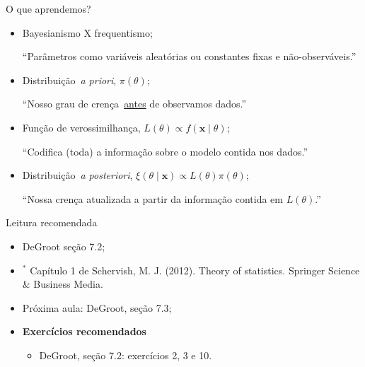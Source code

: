 \begin{frame}{O que aprendemos?}
\begin{itemize}
 \item[\faLightbulbO] Bayesianismo X frequentismo;
 
 ``Parâmetros como variáveis aleatórias ou constantes fixas e não-observáveis.''
 
 \item[\faHourglassStart] Distribuição~\textit{a priori}, $\pi(\theta)$;
 
 ``Nosso grau de crença~\underline{antes} de observamos dados.''
 
 \item[\faInfoCircle] Função de verossimilhança, $L(\theta) \propto f(\boldsymbol x \mid \theta)$;

 ``Codifica (toda) a informação sobre o modelo contida nos dados.''
 
 \item[\faHourglassEnd] Distribuição~\textit{a posteriori}, $\xi(\theta \mid \boldsymbol x) \propto L(\theta)\pi(\theta)$;
 
 ``Nossa crença atualizada a partir da informação contida em $L(\theta)$.''
 \end{itemize}
\end{frame}
\begin{frame}{Leitura recomendada}
\begin{itemize}
 \item[\faBook] DeGroot seção 7.2;
 \item[\faBook] $^\ast$ Capítulo 1 de Schervish, M. J. (2012). Theory of statistics. Springer Science \& Business Media.
 \item[\faForward] Próxima aula: DeGroot, seção 7.3;
 \item {\large\textbf{Exercícios recomendados}}
 \begin{itemize}
  \item[\faBookmark] DeGroot, seção 7.2: exercícios 2, 3 e 10. 
 \end{itemize}

\end{itemize} 
\end{frame}
